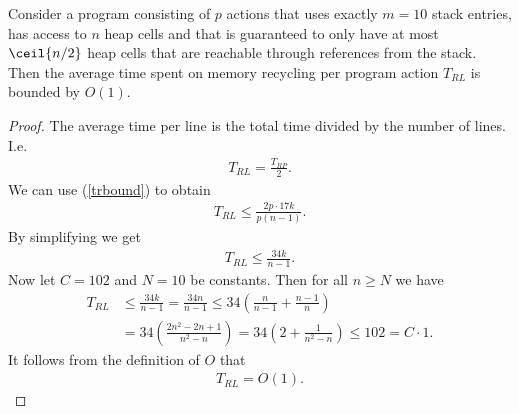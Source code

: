 \documentclass{article}
\begin{document}
\begin{claim*}
    Consider a program consisting of $p$ actions that uses exactly $m=10$
    stack entries, has access to $n$ heap cells and that is guaranteed to only
    have at most $\ceil{n/2}$ heap cells that are reachable through references
    from the stack. Then the average time spent on memory recycling per program
    action $T_{RL}$ is bounded by $O(1)$.
\end{claim*}
\begin{proof}
    The average time per line is the total time divided by the number of lines.
    I.e.
    \begin{align*}
        T_{RL} = \frac{T_{RP}}{2}.
    \end{align*}
    We can use (\ref{trbound}) to obtain
    \begin{align*}
        T_{RL} \leq \frac{2p\cdot 17k}{p(n-1)}.
    \end{align*}
    By simplifying we get
    \begin{align*}
        T_{RL} \leq \frac{34k}{n-1}.
    \end{align*}
    Now let $C=102$ and $N=10$ be constants. Then for all $n\geq N$
    we have
    \begin{align*}
        T_{RL} &\leq \frac{34k}{n-1} = \frac{34n}{n-1} \leq 34\left(\frac{n}{n-1}+\frac{n-1}{n}\right)\\
        &=34\left(\frac{2n^2-2n+1}{n^2-n}\right)=34\left(2+\frac{1}{n^2-n}\right)\leq 102 = C\cdot 1.
    \end{align*}
    It follows from the definition of $O$ that
    \begin{align*}
        T_{RL} = O(1).
    \end{align*}
\end{proof}
\end{document}
